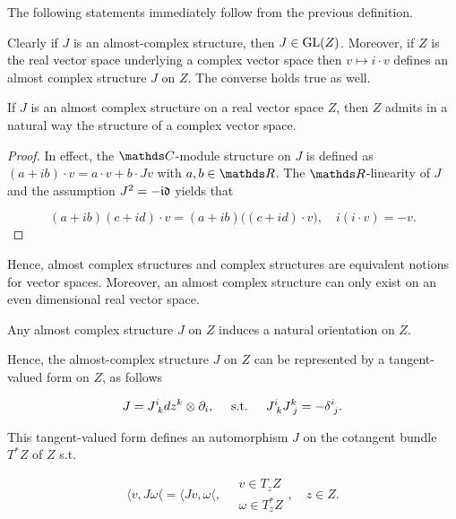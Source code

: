 The following statements immediately follow from the previous definition. \medbreak 

Clearly if $J$ is an almost-complex structure, then $J \in \textnormal{GL}(Z)$. Moreover, if $Z$ is the real vector space underlying a complex vector space then $v \mapsto i\cdot v$ defines an almost complex structure $J$ on $Z$. The converse holds true as well.

\begin{lemma}
    If $J$ is an almost complex structure on a real vector space $Z$, then $Z$ admits in a natural way the structure of a complex vector space. 
\end{lemma}

\begin{proof}
    In effect, the $\C$-module structure on $J$ is defined as $(a+ib)\cdot v = a \cdot v + b \cdot J v$ with $a,b \in \R$. The $\R$-linearity of $J$ and the assumption $J^2 = -\mathfrak{i}\mathfrak{d}$ yields that 
    
    \begin{equation*}
        (a+ib)(c+id)\cdot v = (a+ib) \bigg((c+id) \cdot v\bigg), \quad i(i\cdot v) = -v.  
    \end{equation*}
\end{proof}

Hence, almost complex structures and complex structures are equivalent notions for vector spaces. Moreover, an almost complex structure can only exist on an even dimensional real vector space. 

\begin{lemma}
    Any almost complex structure $J$ on $Z$ induces a natural orientation on $Z$. 
\end{lemma}
      
Hence, the almost-complex structure $J$ on $Z$ can be represented by a tangent-valued form on $Z$, as follows 

\begin{equation}
    J = J^{i}_{\textnormal{ } k} dz^k \otimes \partial_i, \quad \textnormal{ s.t. } \quad J^{i}_{\textnormal{ } k} J^{k}_{\textnormal{ } j} = - \delta^{i}_{\textnormal{ } j}. 
\end{equation}

This tangent-valued form defines an automorphism $J$ on the cotangent bundle $T^{*}Z$ of $Z$ s.t. 

\begin{equation*}
    \langle v, J \omega \langle = \langle J v, \omega \langle, \quad \begin{array}{cc}
         v \in T_z Z  \\
         \omega \in T_z^{*}Z 
    \end{array}, \quad z \in Z.
\end{equation*}

